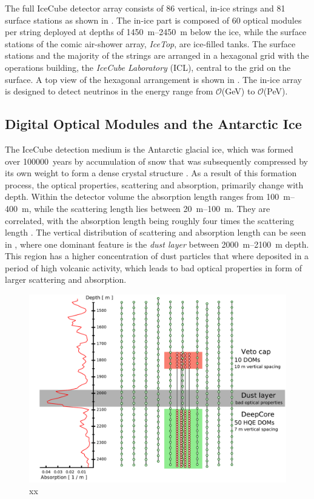 The full IceCube detector array consists of 86 vertical, in-ice strings and 81 surface stations as shown in . The in-ice part is composed of 60 optical modules per string deployed at depths of \SIrange[range-phrase=-]{1450}{2450}{\metre} below the ice, while the surface stations of the comic air-shower array, \textit{IceTop}, are ice-filled tanks. The surface stations and the majority of the strings are arranged in a hexagonal grid with the operations building, the \textit{IceCube Laboratory} (ICL), central to the grid on the surface. A top view of the hexagonal arrangement is shown in . The in-ice array is designed to detect neutrinos in the energy range from $\mathcal{O}$({GeV}) to $\mathcal{O}$(PeV).


\subsection{Digital Optical Modules and the Antarctic Ice} 

The IceCube detection medium is the Antarctic glacial ice, which was formed over \SI{100000}{years} by accumulation of snow that was subsequently compressed by its own weight to form a dense crystal structure . As a result of this formation process, the optical properties, scattering and absorption, primarily change with depth. Within the detector volume the absorption length ranges from \SIrange[range-phrase=-]{100}{400}{\metre}, while the scattering length lies between \SIrange[range-phrase=-]{20}{100}{\metre}. They are correlated, with the absorption length being roughly four times the scattering length . The vertical distribution of scattering and absorption length can be seen in , where one dominant feature is the \textit{dust layer} between \SIrange{2000}{2100}{\metre} depth. This region has a higher concentration of dust particles that where deposited in a period of high volcanic activity, which leads to bad optical properties in form of larger scattering and absorption.

\begin{figure}[h]
    \includegraphics{figures/icecube_deepcore/DeepCore_sideview.pdf}
	\caption[IceCube sideview]{xx}
\end{figure}

